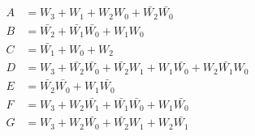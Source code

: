 \documentclass[12pt]{article}
\begin{document}
\begin{align*}
    A & =W_3+W_1+W_2W_0+\bar{W_2}\bar{W_0}                                \\
    B & =\bar{W_2}+\bar{W_1}\bar{W_0}+W_1W_0                              \\
    C & =\bar{W_1}+W_0+W_2                                                \\
    D & =W_3+\bar{W_2}\bar{W_0}+\bar{W_2}W_1+W_1\bar{W_0}+W_2\bar{W_1}W_0 \\
    E & =\bar{W_2}\bar{W_0}+W_1\bar{W_0}                                  \\
    F & =W_3+W_2\bar{W_1}+\bar{W_1}\bar{W_0}+W_1\bar{W_0}                 \\
    G & =W_3+W_2\bar{W_0}+\bar{W_2}W_1+W_2\bar{W_1}                       \\
\end{align*}
\end{document}
